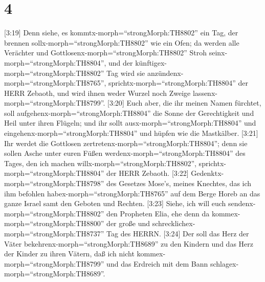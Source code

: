 \hypertarget{section-3}{%
\section{4}\label{section-3}}

 {[}3:19{]} Denn siehe, es
kommtx-morph=``strongMorph:TH8802'' ein Tag, der brennen
sollx-morph=``strongMorph:TH8802'' wie ein Ofen; da werden alle
Verächter und Gottlosenx-morph=``strongMorph:TH8802'' Stroh
seinx-morph=``strongMorph:TH8804'', und der
künftigex-morph=``strongMorph:TH8802'' Tag wird sie
anzündenx-morph=``strongMorph:TH8765'',
sprichtx-morph=``strongMorph:TH8804'' der HERR Zebaoth, und wird ihnen
weder Wurzel noch Zweige lassenx-morph=``strongMorph:TH8799''.
 {[}3:20{]} Euch aber, die ihr meinen Namen fürchtet, soll
aufgehenx-morph=``strongMorph:TH8804'' die Sonne der Gerechtigkeit und
Heil unter ihren Flügeln; und ihr sollt
ausx-morph=``strongMorph:TH8804'' und
eingehenx-morph=``strongMorph:TH8804'' und hüpfen wie die Mastkälber.
 {[}3:21{]} Ihr werdet die Gottlosen
zertretenx-morph=``strongMorph:TH8804''; denn sie sollen Asche unter
euren Füßen werdenx-morph=``strongMorph:TH8804'' des Tages, den ich
machen willx-morph=``strongMorph:TH8802'',
sprichtx-morph=``strongMorph:TH8804'' der HERR Zebaoth. 
{[}3:22{]} Gedenktx-morph=``strongMorph:TH8798'' des Gesetzes Mose's,
meines Knechtes, das ich ihm befohlen habex-morph=``strongMorph:TH8765''
auf dem Berge Horeb an das ganze Israel samt den Geboten und Rechten.
 {[}3:23{]} Siehe, ich will euch
sendenx-morph=``strongMorph:TH8802'' den Propheten Elia, ehe denn da
kommex-morph=``strongMorph:TH8800'' der große und
schrecklichex-morph=``strongMorph:TH8737'' Tag des HERRN. 
{[}3:24{]} Der soll das Herz der Väter
bekehrenx-morph=``strongMorph:TH8689'' zu den Kindern und das Herz der
Kinder zu ihren Vätern, daß ich nicht
kommex-morph=``strongMorph:TH8799'' und das Erdreich mit dem Bann
schlagex-morph=``strongMorph:TH8689''.
